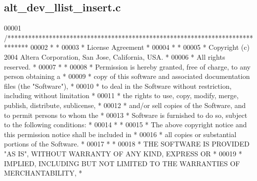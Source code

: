 \subsection{alt\+\_\+dev\+\_\+llist\+\_\+insert.\+c}
\label{alt__dev__llist__insert_8c_source}

\begin{DoxyCode}
00001 \textcolor{comment}{/******************************************************************************}
00002 \textcolor{comment}{*                                                                             *}
00003 \textcolor{comment}{* License Agreement                                                           *}
00004 \textcolor{comment}{*                                                                             *}
00005 \textcolor{comment}{* Copyright (c) 2004 Altera Corporation, San Jose, California, USA.           *}
00006 \textcolor{comment}{* All rights reserved.                                                        *}
00007 \textcolor{comment}{*                                                                             *}
00008 \textcolor{comment}{* Permission is hereby granted, free of charge, to any person obtaining a     *}
00009 \textcolor{comment}{* copy of this software and associated documentation files (the "Software"),  *}
00010 \textcolor{comment}{* to deal in the Software without restriction, including without limitation   *}
00011 \textcolor{comment}{* the rights to use, copy, modify, merge, publish, distribute, sublicense,    *}
00012 \textcolor{comment}{* and/or sell copies of the Software, and to permit persons to whom the       *}
00013 \textcolor{comment}{* Software is furnished to do so, subject to the following conditions:        *}
00014 \textcolor{comment}{*                                                                             *}
00015 \textcolor{comment}{* The above copyright notice and this permission notice shall be included in  *}
00016 \textcolor{comment}{* all copies or substantial portions of the Software.                         *}
00017 \textcolor{comment}{*                                                                             *}
00018 \textcolor{comment}{* THE SOFTWARE IS PROVIDED "AS IS", WITHOUT WARRANTY OF ANY KIND, EXPRESS OR  *}
00019 \textcolor{comment}{* IMPLIED, INCLUDING BUT NOT LIMITED TO THE WARRANTIES OF MERCHANTABILITY,    *}

\end{DoxyCode}
